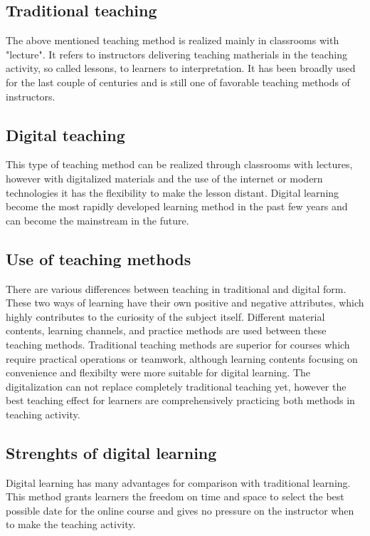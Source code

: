 \documentclass[10pt,oneside,english,a4paper]{article}
\begin{document}
\subsection{Traditional teaching}\label{3.1}

	The above mentioned teaching method is realized mainly in classrooms with "lecture". It refers to instructors delivering teaching matherials in the teaching activity, so called lessons, to learners to interpretation. It has been broadly used for the last couple of centuries and is still one of favorable teaching methods of instructors.\cite{Lin2017}

\subsection{Digital teaching}\label{3.2}

	This type of teaching method can be realized through classrooms with lectures, however with digitalized materials and the use of the internet or modern technologies it has the flexibility to make the lesson distant. Digital learning become the most rapidly developed learning method in the past few years and can become the mainstream in the future.\cite{Lin2017}

\subsection{Use of teaching methods}\label{3.3}

	There are various differences between teaching in traditional and digital form. These two ways of learning have their own positive and negative attributes, which highly contributes to the curiosity of the subject itself. Different material contents, learning channels, and practice methods are used between these teaching methods. Traditional teaching methods are superior for courses which require practical operations or teamwork, although learning contents focusing on convenience and flexibilty were more suitable for digital  learning. The digitalization can not replace completely traditional teaching yet, however the best teaching effect for learners are comprehensively practicing both methods in teaching activity.\cite{Lin2017}

\subsection{Strenghts of digital learning}\label{3.4}

	Digital learning has many advantages for comparison with traditional learning. This method grants learners the freedom on time and space to select the best possible date for the online course and gives no pressure on the instructor when to make the teaching activity.  \cite{Lin2017}
\end{document}
